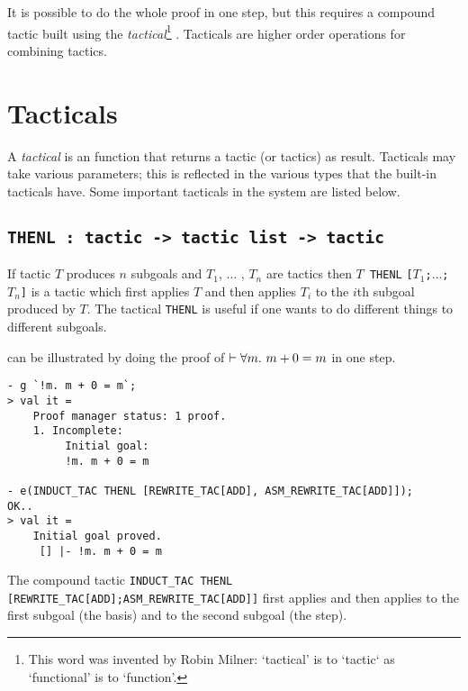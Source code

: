     It is possible to do the whole proof in one step, but this
    requires a compound tactic built using the {\it
      tactical\/}\footnote{This word was invented by Robin Milner:
      `tactical' is to `tactic` as `functional' is to `function'.}
    .  Tacticals are higher order operations for combining
    tactics.

\section{Tacticals}
\label{tacticals}

A {\it tactical\/} is an \ML{} function that returns a tactic (or
tactics) as result.  Tacticals may take various parameters; this is
reflected in the various \ML{} types that the built-in tacticals have.
Some important tacticals in the \HOL{} system are listed below.


\subsection{\tt THENL : tactic -> tactic list -> tactic}

If tactic $T$ produces $n$ subgoals and $T_1$, $\ldots$ , $T_n$ are
tactics then $T${\small\verb| THENL|}
{\small\verb|[|}$T_1${\small\verb|;|}$\ldots${\small\verb|;|}$T_n${\small\verb|]|}
is a tactic which first applies $T$ and then applies $T_i$ to the
$i$th subgoal produced by $T$.  The tactical {\small\verb|THENL|} is
useful if one wants to do different things to different subgoals.

 can be illustrated by doing the proof of $\vdash \forall m.\ m+0=m$ in
one step.

\setcounter{sessioncount}{0}
\begin{session}\begin{verbatim}
- g `!m. m + 0 = m`;
> val it =
    Proof manager status: 1 proof.
    1. Incomplete:
         Initial goal:
         !m. m + 0 = m

- e(INDUCT_TAC THENL [REWRITE_TAC[ADD], ASM_REWRITE_TAC[ADD]]);
OK..
> val it =
    Initial goal proved.
     [] |- !m. m + 0 = m
\end{verbatim}\end{session}

\noindent The compound tactic
{\small\verb|INDUCT_TAC THENL [REWRITE_TAC[ADD];ASM_REWRITE_TAC[ADD]]|}
first applies  and then applies
 to the first subgoal (the basis) and
 to the second subgoal (the step).

